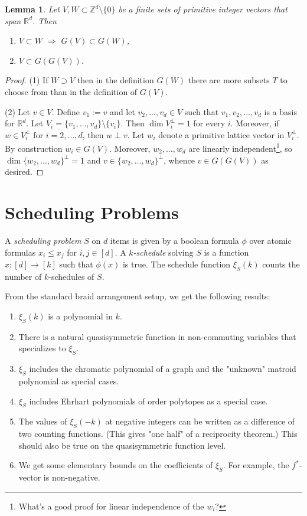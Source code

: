 \documentclass[11pt,letter]{amsart}
\newtheorem{lemma}[definition]{Lemma}
\newcommand{\rAr}{\Rightarrow}
\newcommand{\RR}{\mathbb{R}}
\newcommand{\ZZ}{\mathbb{Z}}
\renewcommand{\dim}{\mathsf{dim}\ }
\newcommand{\defn}[1]{\emph{#1}}
\renewcommand{\dim}{\operatorname{dim}}
\begin{document}
\begin{lemma}
Let $V,W\subset \ZZ^d\setminus\{0\}$ be a finite sets of primitive integer vectors that span $\RR^d$. Then 
\begin{enumerate}
\item $V\subset W$ $\rAr$ $G(V)\subset G(W)$,
\item $V \subset G(G(V))$.
\end{enumerate}
\end{lemma}

\begin{proof}
(1) If $W\supset V$ then in the definition $G(W)$ there are more subsets $T$ to choose from than in the definition of $G(V)$.

(2) Let $v\in V$. Define $v_1:=v$ and let $v_2,\ldots,v_d\in V$ such that $v_1,v_2,\ldots,v_d$ is a basis for $\RR^d$. Let $V_i=\{v_1,\ldots,v_d\}\setminus\{v_i\}$. Then $\dim V_i^\perp = 1$ for every $i$. Moreover, if $w\in V_i^\perp$ for $i=2,\ldots,d$, then $w\perp v$. Let $w_i$ denote a primitive lattice vector in $V_i^\perp$. By construction $w_i\in G(V)$. Moreover, $w_2,\ldots,w_d$ are linearly independent\footnote{What's a good proof for linear independence of the $w_i$?}, so $\dim \{w_2,\ldots,w_d\}^\perp=1$ and $v\in \{w_2,\ldots,w_d\}^\perp$, whence $v\in G(G(V))$ as desired.  
\end{proof}


\section{Scheduling Problems}

A \defn{scheduling problem} $S$ on $d$ items is given by a boolean formula $\phi$ over atomic formulas $x_i\leq x_j$ for $i,j\in[d]$. A \defn{$k$-schedule} solving $S$ is a function $x:[d]\rightarrow[k]$ such that $\phi(x)$ is true. The schedule function $\xi_S(k)$ counts the number of $k$-schedules of $S$.

From the standard braid arrangement setup, we get the following results:
\begin{enumerate}
\item $\xi_S(k)$ is a polynomial in $k$.
\item There is a natural quasisymmetric function in non-commuting variables that specializes to $\xi_S$.
\item $\xi_S$ includes the chromatic polynomial of a graph and the "unknown" matroid polynomial as special cases.
\item $\xi_S$ includes Ehrhart polynomials of order polytopes as a special case.
\item The values of $\xi_S(-k)$ at negative integers can be written as a difference of two counting functions. (This gives "one half" of a reciprocity theorem.) This should also be true on the quasisymmetric function level.
\item We get some elementary bounds on the coefficients of $\xi_S$. For example, the $f^*$-vector is non-negative. 
\end{enumerate}
\end{document}
